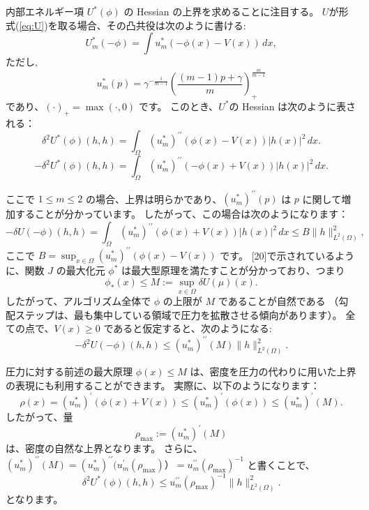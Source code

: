 \documentclass{jsarticle}
\theoremstyle{definition}
\begin{document}
\vspace\baselineskip 

内部エネルギー項 $U^*(\phi)$ の Hessian の上界を求めることに注目する。
$U$が形式(\ref{eq:U})を取る場合、その凸共役は次のように書ける:
\[
    U^*_m(- \phi) = \int u_m^*(- \phi(x) - V(x)) \, dx,
\]
ただし,
$$
    u^*_m(p) = \gamma^{- \frac{1}{m - 1}} \left( \frac{(m - 1)p + \gamma}{m}\right)_+^{\frac{m}{m-1}}
$$
であり、$(\cdot)_+ = \max(\cdot, 0)$ です。
このとき、$U^*$の Hessian は次のように表される：
\begin{equation}
    \label{eq:delta^2U}
    \delta^2 U^*(\phi)(h, h) = \int_\Omega (u_m^*)^{\prime \prime}(\phi(x) - V(x))|h(x)|^2 \, dx.
\end{equation}
\[
    - \delta^2 U^*(\phi)(h, h) = \int_\Omega (u_m^*)^{\prime \prime}(- \phi(x) + V(x))|h(x)|^2 \, dx.
\]

ここで $1 \leq m \leq 2$ の場合、上界は明らかであり、$(u_m^*)^{\prime \prime}(p)$ は $p$ に関して増加することが分かっています。
したがって、この場合は次のようになります：
\[
    - \delta U(- \phi)(h, h) = \int_\Omega (u_m^*)^{\prime \prime}(\phi(x) + V(x))|h(x)|^2 \, dx \leq B\|h\|_{L^2(\Omega)}^2,
\]
ここで $B = \sup_{x\in\Omega}(u_m^*)^{\prime \prime}(\phi(x) - V(x))$ です。
[20]で示されているように、関数 $J$ の最大化元 $\phi^*$ は最大型原理を満たすことが分かっており、つまり
\[
    \phi_*(x) \leq M := \sup_{x \in \Omega} \delta U(\mu)(x).
\]
したがって、アルゴリズム全体で $\phi$ の上限が $M$ であることが自然である
（勾配ステップは、最も集中している領域で圧力を拡散させる傾向があります）。
全ての点で、$V(x) \geq 0$ であると仮定すると、次のようになる:
\[
    - \delta^2 U(- \phi)(h, h) \leq (u_m^*)^{\prime \prime}(M)\|h\|_{L^2(\Omega)}^2.
\]

\vspace\baselineskip 
圧力に対する前述の最大原理 $\phi(x) \leq M$ は、密度を圧力の代わりに用いた上界の表現にも利用することができます。
実際に、以下のようになります：
\[
    \rho(x) = (u_m^*)^\prime (\phi(x) + V(x)) \leq (u_m^*)^\prime(\phi(x)) \leq (u_m^*)^\prime(M).
\]
したがって、量
\begin{equation}
    \label{dfn:rho}
    \rho_{\max} := (u_m^*)^\prime(M)    
\end{equation}
は、密度の自然な上界となります。
さらに、
$(u^*_m)^{\prime \prime} (M) = (u^*_m)^{\prime \prime}(u^\prime_m(\rho_{\max})） = u_m^{\prime \prime}(\rho_{\max})^{-1}$
と書くことで、
\[
    \delta^2 U^*(\phi)(h, h) \leq u_m^{\prime\prime}(\rho_{\max})^{-1} \|h\|_{L^2(\Omega)}^2.
\]
となります。\\
\end{document}
